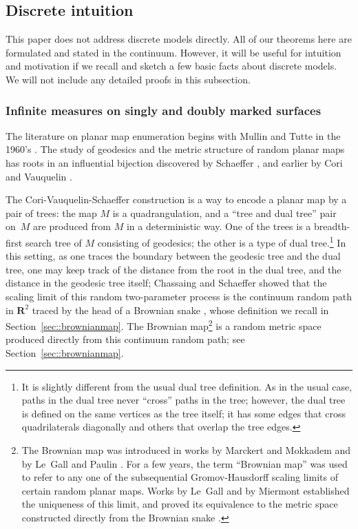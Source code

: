 \documentclass[JEP,XML,SOM,Unicode]{cedram}
\theoremstyle{plain}
\numberwithin{theorem}{section}
\theoremstyle{definition}
\newcommand{\R}{\mathbf{R}}
\begin{document}
\subsection{Discrete intuition}
\label{subsec::discreteintuition}

This paper does not address discrete models directly. All of our theorems here are formulated and stated in the continuum. However, it will be useful for intuition and motivation if we recall and sketch a few basic facts about discrete models. We will not include any detailed proofs in this subsection.

\subsubsection{Infinite measures on singly and doubly marked surfaces}
The literature on planar map enumeration begins with Mullin and Tutte in the 1960's \cite{tutte1962census,mullintrees,MR0218276}. The study of geodesics and the metric structure of random planar maps has roots in an influential bijection discovered by Schaeffer \cite{MR1465581}, and earlier by Cori and Vauquelin \cite{cori1981planar}.

The Cori-Vauquelin-Schaeffer construction is a way to encode a planar map by a pair of trees: the map $M$ is a quadrangulation, and a ``tree and dual tree'' pair on~$M$ are produced from $M$ in a deterministic way. One of the trees is a breadth-first search tree of $M$ consisting of geodesics; the other is a type of dual tree.\footnote{It is slightly different from the usual dual tree definition. As in the usual case, paths in the dual tree never ``cross'' paths in the tree; however, the dual tree is defined on the same vertices as the tree itself; it has some edges that cross quadrilaterals diagonally and others that overlap the tree edges.} In this setting, as one traces the boundary between the geodesic tree and the dual tree, one may keep track of the distance from the root in the dual tree, and the distance in the geodesic tree itself; Chassaing and Schaeffer showed that the scaling limit of this random two-parameter process is the continuum random path in $\R^2$ traced by the head of a Brownian snake \cite{chassaingschaeffer}, whose definition we recall in Section~\ref{sec::brownianmap}.
The Brownian map\footnote{The Brownian map was introduced in works by Marckert and Mokkadem and by Le~Gall and Paulin \cite{marckert2006limit,le2008scaling}. For a few years, the term ``Brownian map'' was used to refer to any one of the subsequential Gromov-Hausdorff scaling limits of certain random planar maps. Works by Le~Gall and by Miermont established the uniqueness of this limit, and proved its equivalence to the metric space constructed directly from the Brownian snake \cite{legalluniqueanduniversal, miermontlimit, legalluniversallimit}.}
is a random metric space produced directly from this continuum random path; see Section~\ref{sec::brownianmap}.
\end{document}
